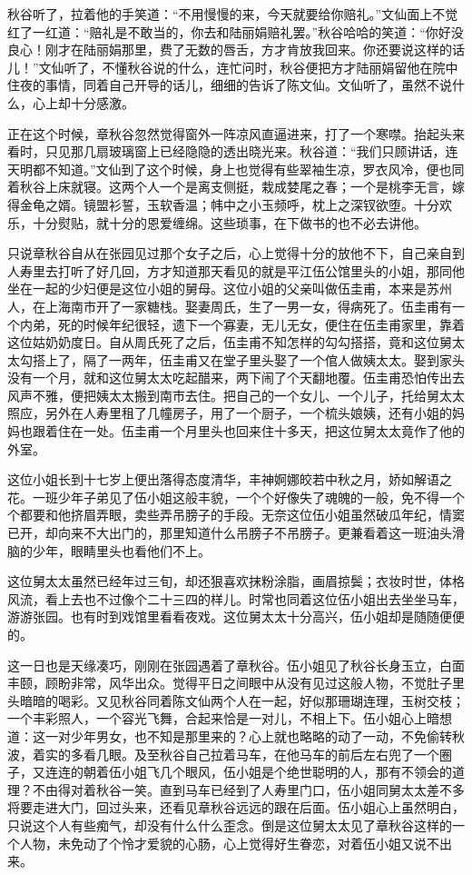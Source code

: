 \documentclass[12pt,UTF8]{ctexbook}
\begin{document}
{{{秋谷听了，拉着他的手笑道：“不用慢慢的来，今天就要给你赔礼。”文仙面上不觉红了一红道：“赔礼是不敢当的，你去和陆丽娟赔礼罢。”秋谷哈哈的笑道：“你好没良心！刚才在陆丽娟那里，费了无数的唇舌，方才肯放我回来。你还要说这样的话儿！”文仙听了，不懂秋谷说的什么，连忙问时，秋谷便把方才陆丽娟留他在院中住夜的事情，同着自己开导的话儿，细细的告诉了陈文仙。文仙听了，虽然不说什么，心上却十分感激。

正在这个时候，章秋谷忽然觉得窗外一阵凉风直逼进来，打了一个寒噤。抬起头来看时，只见那几扇玻璃窗上已经隐隐的透出晓光来。秋谷道：“我们只顾讲话，连天明都不知道。”文仙到了这个时候，身上也觉得有些翠袖生凉，罗衣风冷，便也同着秋谷上床就寝。这两个人一个是离支侧挺，栽成婪尾之春；一个是桃李无言，嫁得金龟之婿。镜盟衫誓，玉软香温；帏中之小玉频呼，枕上之深钗欲堕。十分欢乐，十分熨贴，就十分的恩爱缠绵。这些琐事，在下做书的也不必去讲他。

只说章秋谷自从在张园见过那个女子之后，心上觉得十分的放他不下，自己亲自到人寿里去打听了好几回，方才知道那天看见的就是平江伍公馆里头的小姐，那同他坐在一起的少妇便是这位小姐的舅母。这位小姐的父亲叫做伍圭甫，本来是苏州人，在上海南市开了一家糖栈。娶妻周氏，生了一男一女，得病死了。伍圭甫有一个内弟，死的时候年纪很轻，遗下一个寡妻，无儿无女，便住在伍圭甫家里，靠着这位姑奶奶度日。自从周氏死了之后，伍圭甫不知怎样的勾勾搭搭，竟和这位舅太太勾搭上了，隔了一两年，伍圭甫又在堂子里头娶了一个倌人做姨太太。娶到家头没有一个月，就和这位舅太太吃起醋来，两下闹了个天翻地覆。伍圭甫恐怕传出去风声不雅，便把姨太太搬到南市去住。把自己的一个女儿、一个儿子，托给舅太太照应，另外在人寿里租了几幢房子，用了一个厨子，一个梳头娘姨，还有小姐的妈妈也跟着住在一处。伍圭甫一个月里头也回来住十多天，把这位舅太太竟作了他的外室。

这位小姐长到十七岁上便出落得态度清华，丰神婀娜皎若中秋之月，娇如解语之花。一班少年子弟见了伍小姐这般丰貌，一个个好像失了魂魄的一般，免不得一个个都要和他挤眉弄眼，卖些弄吊膀子的手段。无奈这位伍小姐虽然破瓜年纪，情窦已开，却向来不大出门的，那里知道什么吊膀子不吊膀子。更兼看着这一班油头滑脑的少年，眼睛里头也看他们不上。

这位舅太太虽然已经年过三旬，却还狠喜欢抹粉涂脂，画眉掠鬓；衣妆时世，体格风流，看上去也不过像个二十三四的样儿。时常也同着这位伍小姐出去坐坐马车，游游张园。也有时到戏馆里看看夜戏。这位舅太太十分高兴，伍小姐却是随随便便的。

这一日也是天缘凑巧，刚刚在张园遇着了章秋谷。伍小姐见了秋谷长身玉立，白面丰颐，顾盼非常，风华出众。觉得平日之间眼中从没有见过这般人物，不觉肚子里头暗暗的喝彩。又见秋谷同着陈文仙两个人在一起，好似那珊瑚连理，玉树交枝；一个丰彩照人，一个容光飞舞，合起来恰是一对儿，不相上下。伍小姐心上暗想道：这一对少年男女，也不知是那里来的？心上就也略略的动了一动，不免偷转秋波，着实的多看几眼。及至秋谷自己拉着马车，在他马车的前后左右兜了一个圈子，又连连的朝着伍小姐飞几个眼风，伍小姐是个绝世聪明的人，那有不领会的道理？不由得对着秋谷一笑。直到马车已经到了人寿里门口，伍小姐同舅太太差不多将要走进大门，回过头来，还看见章秋谷远远的跟在后面。伍小姐心上虽然明白，只说这个人有些痴气，却没有什么什么歪念。倒是这位舅太太见了章秋谷这样的一个人物，未免动了个怜才爱貌的心肠，心上觉得好生眷恋，对着伍小姐又说不出来。

}}}
\end{document}
